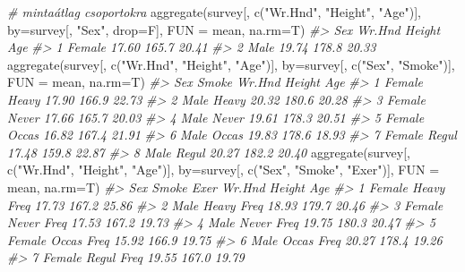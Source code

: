 \documentclass[
]{book}
\newenvironment{Shaded}{\begin{snugshade}}{\end{snugshade}}
\newcommand{\AttributeTok}[1]{\textcolor[rgb]{0.77,0.63,0.00}{#1}}
\newcommand{\CommentTok}[1]{\textcolor[rgb]{0.56,0.35,0.01}{\textit{#1}}}
\newcommand{\FunctionTok}[1]{\textcolor[rgb]{0.00,0.00,0.00}{#1}}
\newcommand{\NormalTok}[1]{#1}
\newcommand{\StringTok}[1]{\textcolor[rgb]{0.31,0.60,0.02}{#1}}
\begin{document}
\begin{Shaded}
\begin{Highlighting}[]
\CommentTok{\# mintaátlag csoportokra}
\FunctionTok{aggregate}\NormalTok{(survey[,  }\FunctionTok{c}\NormalTok{(}\StringTok{"Wr.Hnd"}\NormalTok{, }\StringTok{"Height"}\NormalTok{, }\StringTok{"Age"}\NormalTok{)], }\AttributeTok{by=}\NormalTok{survey[, }\StringTok{"Sex"}\NormalTok{, }\AttributeTok{drop=}\NormalTok{F], }\AttributeTok{FUN =}\NormalTok{ mean, }\AttributeTok{na.rm=}\NormalTok{T)}
\CommentTok{\#\textgreater{}      Sex Wr.Hnd Height   Age}
\CommentTok{\#\textgreater{} 1 Female  17.60  165.7 20.41}
\CommentTok{\#\textgreater{} 2   Male  19.74  178.8 20.33}
\FunctionTok{aggregate}\NormalTok{(survey[,  }\FunctionTok{c}\NormalTok{(}\StringTok{"Wr.Hnd"}\NormalTok{, }\StringTok{"Height"}\NormalTok{, }\StringTok{"Age"}\NormalTok{)], }\AttributeTok{by=}\NormalTok{survey[, }\FunctionTok{c}\NormalTok{(}\StringTok{"Sex"}\NormalTok{, }\StringTok{"Smoke"}\NormalTok{)], }\AttributeTok{FUN =}\NormalTok{ mean, }\AttributeTok{na.rm=}\NormalTok{T)}
\CommentTok{\#\textgreater{}      Sex Smoke Wr.Hnd Height   Age}
\CommentTok{\#\textgreater{} 1 Female Heavy  17.90  166.9 22.73}
\CommentTok{\#\textgreater{} 2   Male Heavy  20.32  180.6 20.28}
\CommentTok{\#\textgreater{} 3 Female Never  17.66  165.7 20.03}
\CommentTok{\#\textgreater{} 4   Male Never  19.61  178.3 20.51}
\CommentTok{\#\textgreater{} 5 Female Occas  16.82  167.4 21.91}
\CommentTok{\#\textgreater{} 6   Male Occas  19.83  178.6 18.93}
\CommentTok{\#\textgreater{} 7 Female Regul  17.48  159.8 22.87}
\CommentTok{\#\textgreater{} 8   Male Regul  20.27  182.2 20.40}
\FunctionTok{aggregate}\NormalTok{(survey[,  }\FunctionTok{c}\NormalTok{(}\StringTok{"Wr.Hnd"}\NormalTok{, }\StringTok{"Height"}\NormalTok{, }\StringTok{"Age"}\NormalTok{)], }\AttributeTok{by=}\NormalTok{survey[, }\FunctionTok{c}\NormalTok{(}\StringTok{"Sex"}\NormalTok{, }\StringTok{"Smoke"}\NormalTok{, }\StringTok{"Exer"}\NormalTok{)], }\AttributeTok{FUN =}\NormalTok{ mean, }\AttributeTok{na.rm=}\NormalTok{T)}
\CommentTok{\#\textgreater{}       Sex Smoke Exer Wr.Hnd Height   Age}
\CommentTok{\#\textgreater{} 1  Female Heavy Freq  17.73  167.2 25.86}
\CommentTok{\#\textgreater{} 2    Male Heavy Freq  18.93  179.7 20.46}
\CommentTok{\#\textgreater{} 3  Female Never Freq  17.53  167.2 19.73}
\CommentTok{\#\textgreater{} 4    Male Never Freq  19.75  180.3 20.47}
\CommentTok{\#\textgreater{} 5  Female Occas Freq  15.92  166.9 19.75}
\CommentTok{\#\textgreater{} 6    Male Occas Freq  20.27  178.4 19.26}
\CommentTok{\#\textgreater{} 7  Female Regul Freq  19.55  167.0 19.79}

\end{Highlighting}
\end{Shaded}
\end{document}

